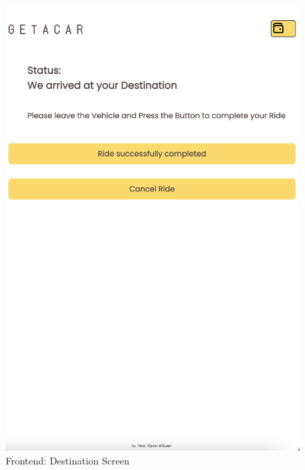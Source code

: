 \begin{figure}[h]
\begin{minipage}{0.45\linewidth}
        \includegraphics[width=\linewidth]{data/ffss/10.png}
        \caption{Frontend: Destination Screen}
        \label{fig:DestinationScreen}
    \end{minipage}
    
\end{figure}



